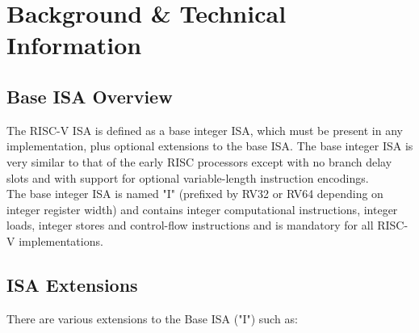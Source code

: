 
%
{}


\chapter{Background \& Technical Information}
	\minitoc
	\section{Base ISA Overview}
	\label{sec:Overview}
	The RISC-V ISA is defined as a base integer ISA, which must be present in any implementation, plus optional extensions to the base ISA. The base integer ISA is very similar to that of the early RISC processors except with no branch delay slots and with support for optional variable-length instruction encodings. \\
	
	The base integer ISA is named "I" (prefixed by RV32 or RV64 depending on integer register width) and contains integer computational instructions, integer loads, integer stores and control-flow instructions and is mandatory for all RISC-V implementations.
	\clearpage
	\section{ISA Extensions}
	\label{sec:Extensions}
	There are various extensions to the Base ISA ("I") such as:  \\\\
	
